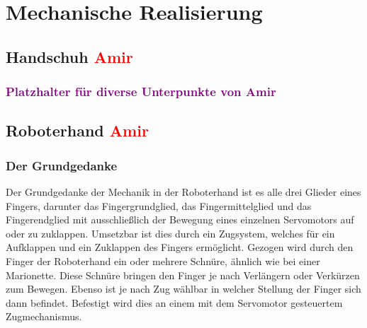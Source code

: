 \documentclass[titlepage,12pt,twoside]{article}
\begin{document}
\newpage
\section{Mechanische Realisierung}
\label{chap:Mechanische Realisierung}

\subsection{Handschuh \textcolor{red}{Amir}}
\subsubsection{\textcolor{purple}{Platzhalter für diverse Unterpunkte von Amir}}


\newpage
\subsection{Roboterhand \textcolor{red}{Amir}}
\subsubsection{Der Grundgedanke}
Der Grundgedanke der Mechanik in der Roboterhand ist es alle drei Glieder eines Fingers,
darunter das Fingergrundglied, das Fingermittelglied und das Fingerendglied mit 
ausschließlich der Bewegung eines einzelnen Servomotors auf oder zu zuklappen. 
Umsetzbar ist dies durch ein Zugsystem, welches für ein Aufklappen und ein Zuklappen 
des Fingers ermöglicht. Gezogen wird durch den Finger der Roboterhand ein oder mehrere 
Schnüre, ähnlich wie bei einer Marionette. Diese Schnüre bringen den Finger je nach 
Verlängern oder Verkürzen zum Bewegen. Ebenso ist je nach Zug wählbar in welcher 
Stellung der Finger sich dann befindet. Befestigt wird dies an einem mit dem Servomotor 
gesteuertem Zugmechanismus. \\
\end{document}
